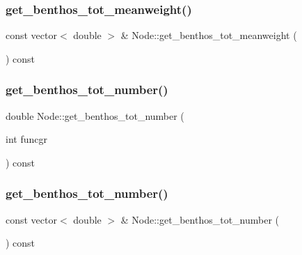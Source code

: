 \mbox{\label{class_node_ae8a9a7d07a588d6f91cc23c9c6f1f0af}} 
\subsubsection{\texorpdfstring{get\_benthos\_tot\_meanweight()}{get\_benthos\_tot\_meanweight()}\hspace{0.1cm}{\footnotesize\ttfamily [2/2]}}
{\footnotesize\ttfamily const vector$<$ double $>$ \& Node\+::get\+\_\+benthos\+\_\+tot\+\_\+meanweight (\begin{DoxyParamCaption}{ }\end{DoxyParamCaption}) const}

\mbox{\label{class_node_a44941fc8eed17cf2e1504da668e7669f}} 
\subsubsection{\texorpdfstring{get\_benthos\_tot\_number()}{get\_benthos\_tot\_number()}\hspace{0.1cm}{\footnotesize\ttfamily [1/2]}}
{\footnotesize\ttfamily double Node\+::get\+\_\+benthos\+\_\+tot\+\_\+number (\begin{DoxyParamCaption}\item[{int}]{funcgr }\end{DoxyParamCaption}) const}

\mbox{\label{class_node_acb5d5c175ab35aca2818c9635665ddf3}} 
\subsubsection{\texorpdfstring{get\_benthos\_tot\_number()}{get\_benthos\_tot\_number()}\hspace{0.1cm}{\footnotesize\ttfamily [2/2]}}
{\footnotesize\ttfamily const vector$<$ double $>$ \& Node\+::get\+\_\+benthos\+\_\+tot\+\_\+number (\begin{DoxyParamCaption}{ }\end{DoxyParamCaption}) const}


